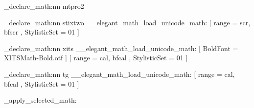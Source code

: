\elegant_declare_math:nn { mtpro2 }
  {
    \let \Bbbk \relax
    \RequirePackage [ lite ] { mtpro2 }
  }

\elegant_declare_math:nn { stixtwo }
  {
    \__elegant_math_load_unicode_math:
      [ range = { scr, bfscr }, StylisticSet = 01 ]
  }

\elegant_declare_math:nn { xits }
  {
    \__elegant_math_load_unicode_math:
      [ BoldFont = XITSMath-Bold.otf ]
      [ range = { cal, bfcal }, StylisticSet = 01 ]
  }

\elegant_declare_math:nn { tg }
  {
    \__elegant_math_load_unicode_math:
      [ range = { cal, bfcal }, StylisticSet = 01 ]
  }

\elegant_apply_selected_math:

\RequirePackage { fixdif }


\endinput

